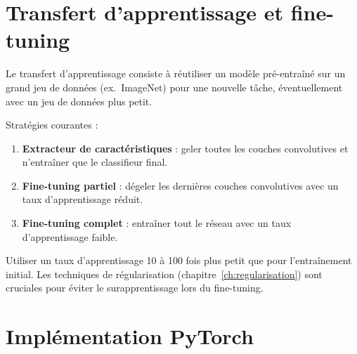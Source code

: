 \section{Transfert d'apprentissage et fine-tuning}
\label{sec:transfer-learning}

\begin{definition}
Le transfert d'apprentissage consiste \`a r\'eutiliser un mod\`ele
pr\'e-entra\^in\'e sur un grand jeu de donn\'ees (ex.\ ImageNet) pour une
nouvelle t\^ache, \'eventuellement avec un jeu de donn\'ees plus petit.
\end{definition}

Strat\'egies courantes :
\begin{enumerate}
  \item \textbf{Extracteur de caract\'eristiques} : geler toutes les couches
    convolutives et n'entra\^iner que le classifieur final.
  \item \textbf{Fine-tuning partiel} : d\'egeler les derni\`eres couches
    convolutives avec un taux d'apprentissage r\'eduit.
  \item \textbf{Fine-tuning complet} : entra\^iner tout le r\'eseau avec un
    taux d'apprentissage faible.
\end{enumerate}

\begin{bonnepratique}[title=\textbf{Taux d'apprentissage pour le fine-tuning}]
Utiliser un taux d'apprentissage 10 \`a 100 fois plus petit que pour
l'entra\^inement initial. Les techniques de
r\'egularisation (chapitre~\ref{ch:regularisation}) sont cruciales pour
\'eviter le surapprentissage lors du fine-tuning.
\end{bonnepratique}

\section{Impl\'ementation PyTorch}
\label{sec:cnn-pytorch}

